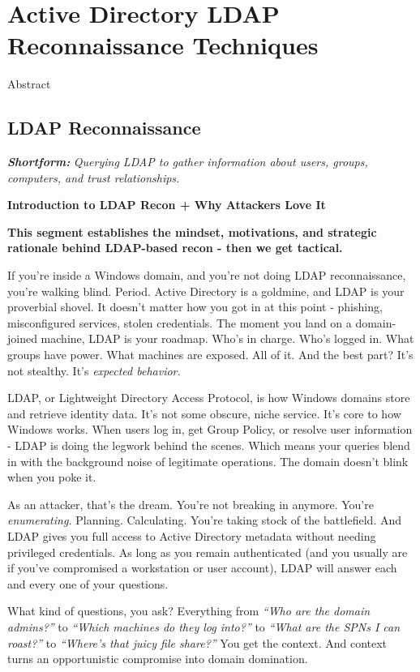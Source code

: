 
\section{\textbf{Active Directory LDAP Reconnaissance Techniques}}

Abstract

\subsection{\textbf{LDAP Reconnaissance}}

\textit{\textbf{Shortform:}}\textit{ Querying LDAP to gather information about users, groups, computers, and trust relationships.}

\textbf{Introduction to LDAP Recon + Why Attackers Love It}

\textbf{This segment establishes the mindset, motivations, and strategic rationale behind LDAP-based recon - then we get tactical.}

If you’re inside a Windows domain, and you’re not doing LDAP reconnaissance, you’re walking blind. Period. Active Directory is a goldmine, and LDAP is your proverbial shovel. It doesn’t matter how you got in at this point - phishing, misconfigured services, stolen credentials. The moment you land on a domain-joined machine, LDAP is your roadmap. Who’s in charge. Who’s logged in. What groups have power. What machines are exposed. All of it. And the best part? It’s not stealthy. It’s\textit{ expected behavior.}

LDAP, or Lightweight Directory Access Protocol, is how Windows domains store and retrieve identity data. It’s not some obscure, niche service. It’s core to how Windows works. When users log in, get Group Policy, or resolve user information - LDAP is doing the legwork behind the scenes. Which means your queries blend in with the background noise of legitimate operations. The domain doesn’t blink when you poke it.

As an attacker, that’s the dream. You’re not breaking in anymore. You’re \textit{enumerating. }Planning. Calculating. You’re taking stock of the battlefield. And LDAP gives you full access to Active Directory metadata without needing privileged credentials. As long as you remain authenticated (and you usually are if you’ve compromised a workstation or user account), LDAP will answer each and every one of your questions.

What kind of questions, you ask? Everything from \textit{“Who are the domain admins?” }to \textit{“Which machines do they log into?” }to \textit{“What are the SPNs I can roast?” }to \textit{“Where’s that juicy file share?” }You get the context. And context turns an opportunistic compromise into domain domination.

